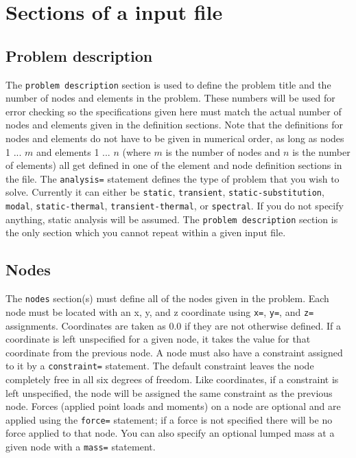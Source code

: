 \section{Sections of a \felt{} input file}

\subsection{Problem description}

The {\tt problem description} section is used to define the problem
title and the number of nodes and elements in the problem.  These numbers will
be used for error checking so the specifications given here must match the 
actual number of nodes and elements given in the definition sections.  Note 
that the definitions for nodes and elements do not have to be given in 
numerical order, as long as nodes 1 ... $m$ and elements 1 ... $n$ (where $m$ 
is the number of nodes and $n$ is the number of elements) all get defined in one 
of the element and node definition sections in the file.  The {\tt analysis=}
statement defines the type of problem that you wish to solve.  Currently
it can either be {\tt static}, {\tt transient}, {\tt static-substitution},
{\tt modal}, {\tt static-thermal}, {\tt transient-thermal}, or {\tt spectral}.  
If you do not specify anything, static analysis will be assumed.  The 
{\tt problem description} section is the only section which you cannot repeat 
within a given input file. 

\subsection{Nodes}

The {\tt nodes} section(s) must define all of the nodes given in the problem.  
Each node must be located with an x, y, and z coordinate using {\tt x=},
{\tt y=}, and {\tt z=} assignments.  Coordinates are 
taken as 0.0 if they are not otherwise defined.  If a coordinate is left 
unspecified for a given node, it takes the value for that coordinate from 
the previous node.  A node must also have a constraint assigned to it by a
{\tt constraint=} statement.  The default 
constraint leaves the node completely free in all six degrees of freedom.  
Like coordinates, if a constraint is left unspecified, the node will be 
assigned the same constraint as the previous node.  Forces (applied point 
loads and moments) on a node are optional and are applied using the
{\tt force=} statement; if a force is not specified there 
will be no force applied to that node.  You can also specify an optional
lumped mass at a given node with a {\tt mass=} statement. 

